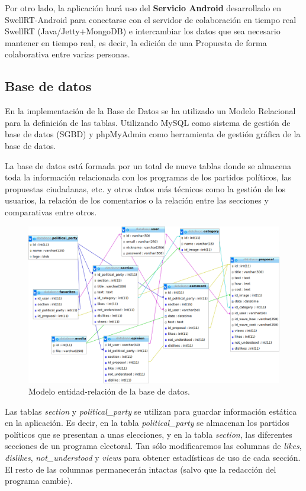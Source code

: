 Por otro lado, la aplicación hará uso del \textbf{Servicio Android} desarrollado en SwellRT-Android \cite{ref:swellRT_android_github} para conectarse con el servidor de colaboración en tiempo real SwellRT (Java/Jetty+MongoDB) e intercambiar los datos que sea necesario mantener en tiempo real, es decir, la edición de una Propuesta de forma colaborativa entre varias personas.


\subsection{Base de datos}

En la implementación de la Base de Datos se ha utilizado un Modelo Relacional para la definición de las tablas. Utilizando MySQL \cite{ref:mysql} como sistema de gestión de base de datos (SGBD) y phpMyAdmin \cite{ref:phpMyAdmin} como herramienta de gestión gráfica de la base de datos.

La base de datos está formada por un total de nueve tablas donde se almacena toda la información relacionada con los programas de los partidos políticos, las propuestas ciudadanas, etc. y otros datos más técnicos como la gestión de los usuarios, la relación de los comentarios o la relación entre las secciones y comparativas entre otros.

\begin{figure}[!]
\centering
\includegraphics[keepaspectratio, scale=0.40]{Media/Captures/database.png}
\caption{Modelo entidad-relación de la base de datos.}
\label{fig:ermodel}
\end{figure}

Las tablas \textit{section} y \textit{political\_party} se utilizan para guardar información estática en la aplicación. Es decir, en la tabla \textit{political\_party} se almacenan los partidos políticos que se presentan a unas elecciones, y en la tabla \textit{section}, las diferentes secciones de un programa electoral. Tan sólo modificaremos las columnas de \textit{likes}, \textit{dislikes}, \textit{not\_understood} y \textit{views} para obtener estadísticas de uso de cada sección. El resto de las columnas permanecerán intactas (salvo que la redacción del programa cambie).

